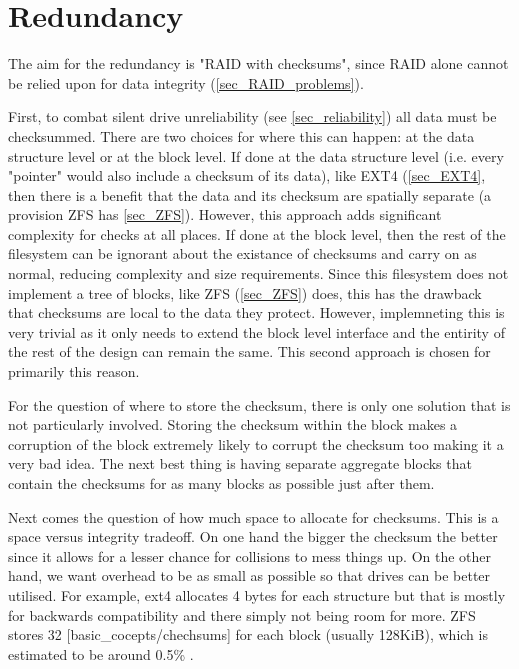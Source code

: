     \section{Redundancy}

        The aim for the redundancy is "RAID with checksums", since RAID alone
        cannot be relied upon for data integrity (\ref{sec_RAID_problems}).

        First, to combat silent drive unreliability (see \ref{sec_reliability})
        all data must be checksummed. There are two choices for where this can
        happen: at the data structure level or at the block level. If done at
        the data structure level (i.e. every "pointer" would also include a
        checksum of its data), like EXT4 (\ref{sec_EXT4}, then there is a
        benefit that the data and its checksum are spatially separate (a
        provision ZFS has \ref{sec_ZFS}). However, this approach adds
        significant complexity for checks at all places. If done at the block
        level, then the rest of the filesystem can be ignorant about the
        existance of checksums and carry on as normal, reducing complexity and
        size requirements. Since this filesystem does not implement a tree of
        blocks, like ZFS (\ref{sec_ZFS}) does, this has the drawback that
        checksums are local to the data they protect. However, implemneting
        this is very trivial as it only needs to extend the block level
        interface and the entirity of the rest of the design can remain the
        same. This second approach is chosen for primarily this reason.

        For the question of where to store the checksum, there is only one
        solution that is not particularly involved. Storing the checksum within
        the block makes a corruption of the block extremely likely to corrupt
        the checksum too making it a very bad idea. The next best thing is
        having separate aggregate blocks that contain the checksums for as many
        blocks as possible just after them.

        Next comes the question of how much space to allocate for checksums.
        This is a space versus integrity tradeoff. On one hand the bigger the
        checksum the better since it allows for a lesser chance for collisions
        to mess things up. On the other hand, we want overhead to be as small
        as possible so that drives can be better utilised. For example, ext4
        allocates 4 bytes for each structure \cite{ext4_docs} but that is
        mostly for backwards compatibility and there simply not being room for
        more. ZFS stores 32 \cite{ZFS_docs}[basic\_cocepts/chechsums] for each
        block (usually 128KiB), which is estimated to be around 0.5\%
        \cite{ZFS_overhead}.


